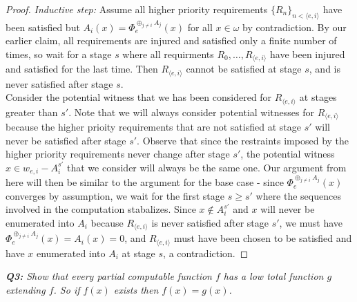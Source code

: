 \documentclass{article}
\begin{document}
\begin{proof}
    \textit{Inductive step:} Assume all higher priority requirements
    $\{R_n\}_{n <\langle e,i\rangle}$ have been satisfied but
    $A_i(x)=\Phi_e^{\oplus_{j\neq i} A_j}(x)$ for all $x\in\omega$ by
    contradiction. By our earlier claim, all requirements are injured
    and satisfied only a finite number of times, so wait for a stage
    $s$ where all requirments $R_0,\ldots,R_{\langle e,i\rangle}$ have
    been injured and satisfied for the last time. Then $R_{\langle
    e,i\rangle}$ cannot be satisfied at stage $s$, and is never
    satisfied after stage $s$. \\

    Consider the potential witness that we has been considered for
    $R_{\langle e,i\rangle}$ at stages greater than $s'$. Note that we
    will always consider potential witnesses for $R_{\langle
    e,i\rangle}$ because the higher prioity requirements that are not
    satisfied at stage $s'$ will never be satisfied after stage $s'$.
    Observe that since the restraints imposed by the higher priority
    requirements never change after stage $s'$, the potential witness
    $x\in w_{e,i}-A_i^{s'}$ that we consider will always be the same
    one. Our argument from here will then be similar to the argument
    for the base case - since $\Phi_e^{\oplus_{j\neq i} A_j}(x)$
    converges by assumption, we wait for the first stage $s\geq s'$
    where the sequences involved in the computation stabalizes. Since
    $x\not\in A_i^{s'}$ and $x$ will never be enumerated into $A_i$
    because $R_{\langle e,i\rangle}$ is never satisfied after stage
    $s'$, we must have $\Phi_e^{\oplus_{j\neq i} A_j}(x)=A_i(x)=0$, and
    $R_{\langle e,i\rangle}$ must have been chosen to be satisfied and
    have $x$ enumerated into $A_i$ at stage $s$, a contradiction.
  \end{proof}

\it \textbf{Q3:} Show that every partial computable function $f$ has a low
  total function $g$ extending $f$. So if $f(x)$ exists then $f(x)=g(x)$.
\end{document}
